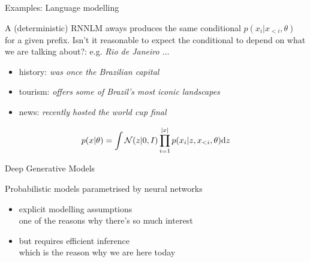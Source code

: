 \documentclass[14pt]{beamer}
\begin{document}
\begin{frame}{Examples: Language modelling}

	A (deterministic) RNNLM aways produces the same conditional $p(x_i|x_{<i}, \theta)$ for a given prefix. \pause Isn't it reasonable to expect the conditional to depend on what we are talking about?: e.g. \emph{Rio de Janeiro $\ldots$}
	\begin{itemize}
		\item history: \emph{was once the Brazilian capital}
		\item tourism: \emph{offers some of Brazil's most iconic landscapes}
		\item news: \emph{recently hosted the world cup final}
	\end{itemize} \pause
	\vspace{-5pt}
	\begin{equation*}
		p(x|\theta) = \int \mathcal N(z|0, I) \prod_{i=1}^{\left|x\right|} p(x_i|z, x_{<i}, \theta) \dd z
	\end{equation*}

\end{frame}


\begin{frame}{Deep Generative Models}

Probabilistic models parametrised by neural networks
\begin{itemize}
	\pause
	\item explicit modelling assumptions\\
	one of the reasons why there's so much interest	
	\pause
	\item but requires efficient inference\\
	\pause
	\alert{which is the reason why we are here today}
\end{itemize}

\end{frame}
\end{document}
